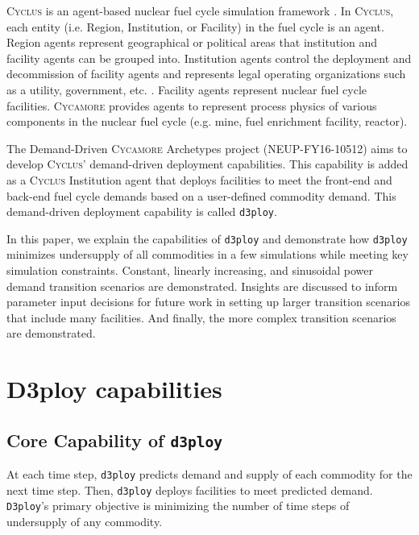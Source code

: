 \documentclass[11pt]{article}
\newcommand{\Cyclus}{\textsc{Cyclus}\xspace}%
\newcommand{\Cycamore}{\textsc{Cycamore}\xspace}%
\newcommand{\deploy}{\texttt{d3ploy}\xspace}%
\newcommand{\Deploy}{\texttt{D3ploy}\xspace}%
\begin{document}
\Cyclus is an agent-based nuclear fuel cycle simulation framework 
\cite{huff_fundamental_2016}. 
In \Cyclus, each entity (i.e. Region, Institution, or Facility) in the 
fuel cycle is an agent. 
Region agents represent geographical or political areas that institution
and facility agents can be grouped into. 
Institution agents control the 
deployment and decommission of facility agents 
and represents legal operating organizations such as a 
utility, government, etc. \cite{huff_fundamental_2016}. 
Facility agents represent nuclear fuel cycle facilities. 
\Cycamore \cite{carlsen_cycamore_2014}
provides agents to represent process physics of various 
components in the nuclear fuel cycle (e.g. mine, fuel enrichment 
facility, reactor). 

The Demand-Driven \Cycamore Archetypes project (NEUP-FY16-10512) 
aims to develop \Cyclus' demand-driven deployment capabilities. 
This capability is added as a \Cyclus Institution
agent that deploys facilities to meet the front-end and back-end 
fuel cycle demands based on a user-defined commodity demand. 
This demand-driven deployment capability is called 
\deploy. 

In this paper, we explain the capabilities of \deploy and
demonstrate how \deploy minimizes undersupply of all 
commodities in a few simulations while meeting key simulation 
constraints. 
Constant, linearly increasing, and sinusoidal power demand
transition scenarios are demonstrated. 
Insights are discussed to inform parameter 
input decisions for future work in setting up 
larger transition scenarios that include many facilities.
And finally, the more complex transition scenarios are
demonstrated. 

\section{D3ploy capabilities}
\subsection{\textbf{Core Capability of \deploy}}
At each time step, \deploy predicts demand and supply of each 
commodity for the next time step.
Then, \deploy deploys facilities to meet predicted demand. 
\Deploy's primary objective is minimizing the number of time 
steps of undersupply of any commodity. 
\end{document}
